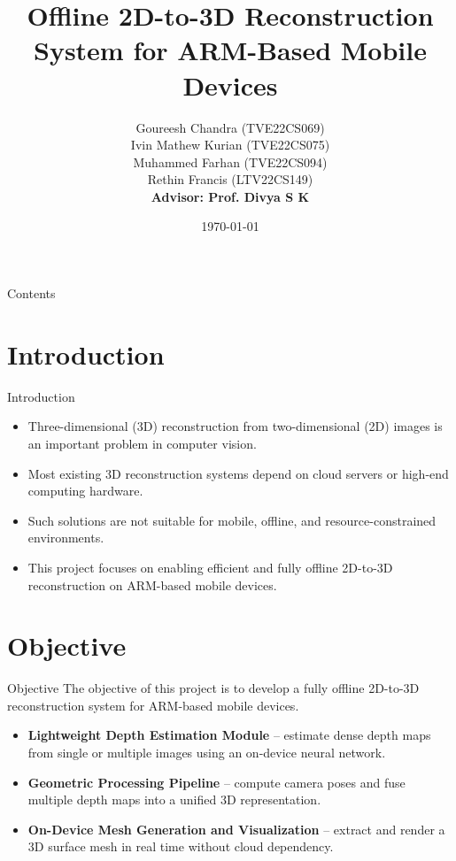 \documentclass[11pt]{beamer}
\title{Offline 2D-to-3D Reconstruction System for ARM-Based Mobile Devices}
\author{
Goureesh Chandra (TVE22CS069) \\ 
Ivin Mathew Kurian (TVE22CS075) \\ 
Muhammed Farhan (TVE22CS094) \\ 
Rethin Francis (LTV22CS149) \\[6pt]
\textbf{Advisor: Prof. Divya S K}
}
\institute{
College of Engineering, Trivandrum \\ 
Dept. of Computer Science \& Engineering
}
\date{\today}
\begin{document}
\begin{frame}
\titlepage
\end{frame}



\begin{frame}{Contents}
  \tableofcontents
\end{frame}

\section{Introduction}
\begin{frame}{Introduction}
\begin{itemize}
\item Three-dimensional (3D) reconstruction from two-dimensional (2D) images is an important problem in computer vision.
\item Most existing 3D reconstruction systems depend on cloud servers or high-end computing hardware.
\item Such solutions are not suitable for mobile, offline, and resource-constrained environments.
\item This project focuses on enabling efficient and fully offline 2D-to-3D reconstruction on ARM-based mobile devices.
\end{itemize}
\end{frame}

\section{Objective}
\begin{frame}{Objective}
The objective of this project is to develop a fully offline 2D-to-3D reconstruction system for ARM-based mobile devices.

\medskip
\begin{itemize}
\item \textbf{Lightweight Depth Estimation Module} -- estimate dense depth maps from single or multiple images using an on-device neural network.
\item \textbf{Geometric Processing Pipeline} -- compute camera poses and fuse multiple depth maps into a unified 3D representation.
\item \textbf{On-Device Mesh Generation and Visualization} -- extract and render a 3D surface mesh in real time without cloud dependency.
\end{itemize}
\end{frame}
\end{document}
